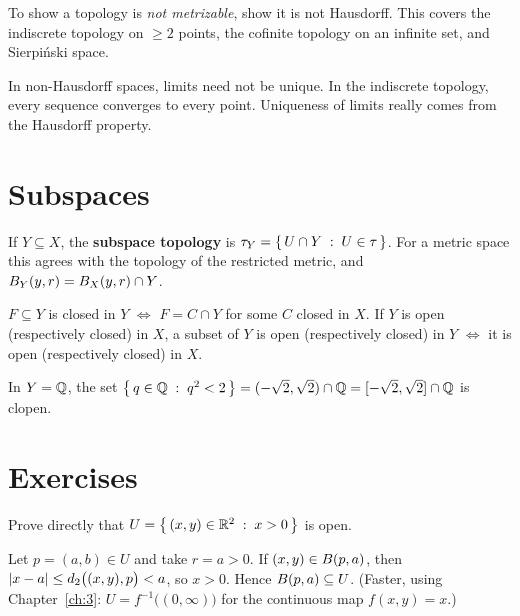 \begin{examtip}
To show a topology is \emph{not metrizable}, show it is not Hausdorff. This covers the indiscrete topology on $\ge2$ points, the cofinite topology on an infinite set, and Sierpiński space.
\end{examtip}

\begin{warning}
In non-Hausdorff spaces, limits need not be unique. In the indiscrete topology, every sequence converges to every point. Uniqueness of limits really comes from the Hausdorff property.
\end{warning}

\section{Subspaces}\label{sec:subspace}
\begin{definition}
If $Y\subseteq X$, the \textbf{subspace topology} is $\tau_Y=\left\{\, U\cap Y \;:\; U\in\tau \,\right\}$. For a metric space this agrees with the topology of the restricted metric, and $B_Y(y,r)=B_X(y,r)\cap Y$.
\end{definition}

\begin{proposition}
$F\subseteq Y$ is closed in $Y$ $\iff$ $F=C\cap Y$ for some $C$ closed in $X$. If $Y$ is open (respectively closed) in $X$, a subset of $Y$ is open (respectively closed) in $Y$ $\iff$ it is open (respectively closed) in $X$.
\end{proposition}

\begin{example}
In $Y=\mathbb{Q}$, the set $\left\{\, q\in\mathbb{Q} \;:\; q^2<2 \,\right\}=(-\sqrt2,\sqrt2)\cap\mathbb{Q}=[-\sqrt2,\sqrt2]\cap\mathbb{Q}$ is clopen.
\end{example}

\section{Exercises}
\begin{exercise}\easy
Prove directly that $U=\left\{\, (x,y)\in\mathbb{R}^2 \;:\; x>0 \,\right\}$ is open.
\end{exercise}
\begin{solution}
Let $p=(a,b)\in U$ and take $r=a>0$. If $(x,y)\in B(p,a)$, then $\left\lvert x-a\right\rvert\le d_2\bigl((x,y),p\bigr)<a$, so $x>0$. Hence $B(p,a)\subseteq U$. (Faster, using Chapter~\ref{ch:3}: $U=f^{-1}\bigl((0,\infty)\bigr)$ for the continuous map $f(x,y)=x$.)
\end{solution}

